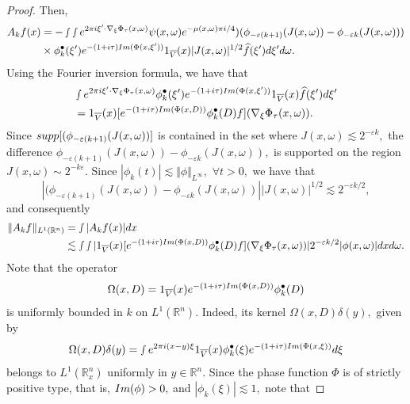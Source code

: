 \documentclass[10pt,a4paper]{amsart}
\begin{document}
\begin{proof}
Then,
\begin{align*}
    A_kf(x)&=- \smallint\smallint e^{2\pi i\xi'\cdot \nabla_\xi\Phi_\tau(x,\omega)}\psi(x,\omega)e^{-\mu(x,\omega)\pi i/4}) (\phi_{-\varepsilon (k+1)}(J(x,\omega))-\phi_{-\varepsilon k}(J(x,\omega)))\\
&\times \phi_{k}^\bullet(\xi')e^{-(1+i\tau)\textnormal{Im}(\Phi(x,\xi'))} 1_{\overline{V}}(x) |J(x,\omega)|^{1/2}\widehat{f}(\xi')d\xi'd\omega. 
\end{align*}
Using the Fourier inversion formula, we have that
\begin{align*}
   & \smallint e^{2\pi i\xi'\cdot \nabla_\xi\Phi_\tau(x,\omega)} \phi_{k}^\bullet(\xi') e^{-(1+i\tau)\textnormal{Im}(\Phi(x,\xi'))}1_{\overline{V}}(x) \widehat{f}(\xi')d\xi'\\
   &=1_{\overline{V}}(x)[e^{-(1+i\tau)\textnormal{Im}(\Phi(x,D))}\phi_{k}^\bullet(D)f](\nabla_\xi\Phi_\tau(x,\omega)).
\end{align*} Since $\textnormal{supp}[(\phi_{-\varepsilon (k+1)}(J(x,\omega))]$ is contained in the set where $J(x,\omega)\lesssim 2^{-\varepsilon k},$ the difference $\phi_{-\varepsilon (k+1)}(J(x,\omega))-\phi_{-\varepsilon k}(J(x,\omega)),$ is supported on the region $J(x,\omega)\sim 2^{-k\varepsilon}.$ Since $|\phi_k(t)|\lesssim \Vert\phi\Vert_{L^{\infty}},$ $\forall t>0,$ we have that $$|(\phi_{-\varepsilon (k+1)}(J(x,\omega))-\phi_{-\varepsilon k}(J(x,\omega))||J(x,\omega)|^{1/2}\lesssim 2^{-\varepsilon k/2},$$
and consequently
\begin{align*}
    \Vert A_k f\Vert_{L^1(\mathbb{R}^n)}  &=\smallint|A_k f(x)|dx\\
    &\lesssim\smallint\smallint |1_{\overline{V}}(x)[e^{-(1+i\tau)\textnormal{Im}(\Phi(x,D))}\phi_{k}^\bullet (D)f](\nabla_\xi\Phi_\tau(x,\omega))|2^{-\varepsilon k/2}|\phi(x,\omega)|dx d\omega.
\end{align*}    Note that the operator 
\begin{equation*}
   \Omega(x,D)= 1_{\overline{V}}(x)e^{-(1+i\tau)\textnormal{Im}(\Phi(x,D))}\phi_{k}^\bullet(D)
\end{equation*}is uniformly bounded in $k$ on $L^1(\mathbb{R}^n).$ Indeed, its kernel $\Omega(x,D)\delta(y),$ given by  
$$ \Omega(x,D)\delta(y)=\smallint e^{2\pi i(x-y)\xi}1_{\overline{V}}(x)\phi_{k}^\bullet(\xi)e^{-(1+i\tau)\textnormal{Im}(\Phi(x,\xi))}d\xi  $$
belongs to $L^1(\mathbb{R}_x^n)$ uniformly in $y\in \mathbb{R}^n.$
Since  the phase function $\Phi$ is of strictly positive type, that is, $\textnormal{Im}(\phi)> 0,$ and $|\phi_{k}(\xi)|\lesssim 1,$ note that

\end{proof}
\end{document}
